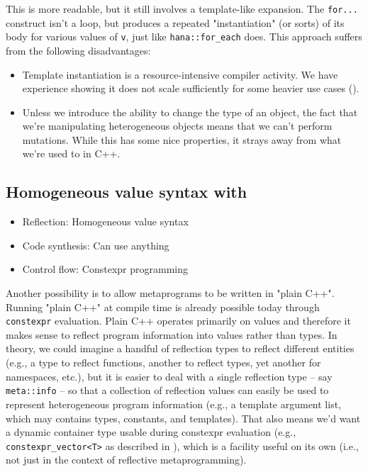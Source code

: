\documentclass{wg21}
\newcommand{\cc}[1]{\texttt{#1}}
\begin{document}
This is more readable, but it still involves a template-like expansion. The
\cc{for...} construct isn't a loop, but produces a repeated "instantiation"
(or sorts) of its body for various values of \cc{v}, just like \cc{hana::for_each}
does. This approach suffers from the following disadvantages:

\begin{itemize}
  \item Template instantiation is a resource-intensive compiler activity. We
        have experience showing it does not scale sufficiently for some heavier
        use cases (\cite{Boost.Hana}).
  \item Unless we introduce the ability to change the type of an object, the
        fact that we're manipulating heterogeneous objects means that we can't
        perform mutations. While this has some nice properties, it strays away
        from what we're used to in C++.
\end{itemize}


\subsection{Homogeneous value syntax with \cite{P0598}}
\begin{itemize}
  \item Reflection: Homogeneous value syntax
  \item Code synthesis: Can use anything
  \item Control flow: Constexpr programming
\end{itemize}

Another possibility is to allow metaprograms to be written in "plain C++".
Running "plain C++" at compile time is already possible today through
\cc{constexpr} evaluation. Plain C++ operates primarily on values and
therefore it makes sense to reflect program information into values rather
than types. In theory, we could imagine a handful of reflection types to
reflect different entities (e.g., a type to reflect functions, another to
reflect types, yet another for namespaces, etc.), but it is easier to deal
with a single reflection type -- say \cc{meta::info} -- so that a collection
of reflection values can easily be used to represent heterogeneous program
information (e.g., a template argument list, which may contains types,
constants, and templates). That also means we'd want a dynamic container
type usable during constexpr evaluation (e.g., \cc{constexpr_vector<T>} as
described in \cite{P0597}), which is a facility useful on its own (i.e., not
just in the context of reflective metaprogramming).
\end{document}
